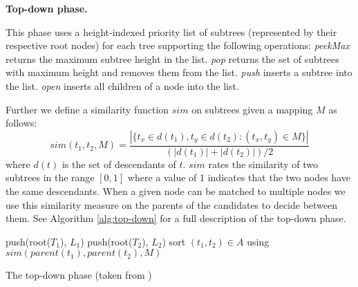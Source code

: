 \documentclass[letterpaper]{article}
\newcommand{\mypar}[1]{{\bf #1.}}
\begin{document}
\mypar{Top-down phase}

This phase uses a height-indexed priority list of subtrees (represented by their respective root nodes) for each tree supporting the following operations: \emph{peekMax} returns the maximum subtree height in the list. \emph{pop} returns the set of subtrees with maximum height and removes them from the list. \emph{push} inserts a subtree into the list. \emph{open} inserts all children of a node into the list.

Further we define a similarity function $sim$ on subtrees given a mapping $M$ as follows:
$$ sim(t_1, t_2, M) = \frac{| \{ t_x \in d(t_1), t_y \in d(t_2) : (t_x, t_y) \in M \} | }{ (|d(t_1)| + |d(t_2)|) / 2} $$
where $d(t)$ is the set of descendants of $t$. $sim$ rates the similarity of two subtrees in the range $[0,1]$ where a value of 1 indicates that the two nodes have the same descendants.
When a given node can be matched to multiple nodes we use this similarity measure on the parents of the candidates to decide between them. See Algorithm \ref{alg:top-down} for a full description of the top-down phase.

\SetAlFnt{\footnotesize}
\SetInd{0.3em}{0.6em}
\SetAlgoVlined

\begin{algorithm}
	push(root($T_1$), $L_1$)\;
	push(root($T_2$), $L_2$)\;
	sort $(t_1,t_2) \in A$ using $sim(parent(t_1),parent(t_2), M)$\;
\caption{The top-down phase (taken from \cite{falleri:2014:structure_diff})}
\label{alg:top-down}
\end{algorithm}
\end{document}
